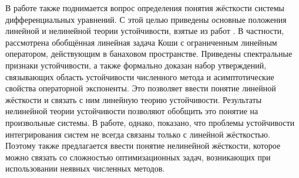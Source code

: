 В работе также поднимается вопрос определения понятия жёсткости системы дифференциальных уравнений.
С этой целью приведены основные положения линейной и нелинейной теории устойчивости, взятые из работ
\cite{dahlquist1975stability, dahlquist1963special, lambert1991methods, heirer1999solvingode2}.
В частности, рассмотрена обобщённая линейная задача Коши с ограниченным линейным оператором, действующим в банаховом пространстве.
Приведены спектральные признаки устойчивости, а также формально доказан набор утверждений,
связывающих область устойчивости численного метода и асимптотические свойства операторной экспоненты.
Это позволяет ввести понятие линейной жёсткости и связать с ним линейную теорию устойчивости.
Результаты нелинейной теории устойчивости позволяют обобщить это понятие на произвольные системы.
В работе, однако, показано, что проблемы устойчивости интегрирования систем не всегда связаны только с линейной жёсткостью.
Поэтому также предлагается ввести понятие нелинейной жёсткости,
которое можно связать со сложностью оптимизационных задач,
возникающих при использовании неявных численных методов.

